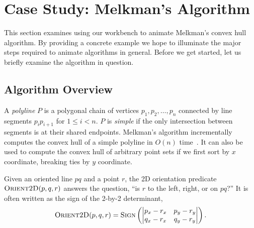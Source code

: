 
\FloatBarrier
\section{Case Study: Melkman's Algorithm}

This section examines using our workbench to animate Melkman's convex hull
algorithm. By providing a concrete example we hope to illuminate the major steps
required to animate algorithms in general. Before we get started, let us briefly
examine the algorithm in question.

\subsection{Algorithm Overview}

A \emph{polyline} $P$ is a polygonal chain of vertices $p_1, p_2, \ldots, p_n$
connected by line segments $p_ip_{i+1}$ for $1 \leq i < n$. $P$ is \emph{simple}
if the only intersection between segments is at their shared endpoints.
Melkman's algorithm incrementally computes the convex hull of a simple polyline
in $O(n)$ time~\cite{melkman1987line}. It can also be used to compute the convex
hull of arbitrary point sets if we first sort by $x$ coordinate, breaking ties
by $y$ coordinate.

Given an oriented line $pq$ and a point $r$, the 2D orientation predicate
$\textsc{Orient2D}(p, q, r)$ answers the question, ``is $r$ to the left, right,
or on $pq$?'' It is often written as the sign of the 2-by-2 determinant, $$
\textsc{Orient2D}(p, q, r) = \textsc{Sign}\left( \begin{vmatrix} p_x-r_x &
p_y-r_y \\ q_x-r_x & q_y-r_y \end{vmatrix} \right).$$

 
